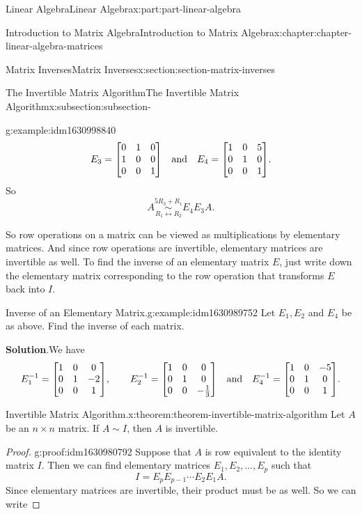 \documentclass[twoside,10pt,]{book}
\newcommand{\blocktitlefont}{\relax}
\numberwithin{equation}{part}
\newcommand{\rowop}[2][]{\overset{#2}{\underset{#1}{\sim}}}
\begin{document}
\begin{partptx}{Linear Algebra}{}{Linear Algebra}{}{}{x:part:part-linear-algebra}
\begin{chapterptx}{Introduction to Matrix Algebra}{}{Introduction to Matrix Algebra}{}{}{x:chapter:chapter-linear-algebra-matrices}
\begin{sectionptx}{Matrix Inverses}{}{Matrix Inverses}{}{}{x:section:section-matrix-inverses}
\begin{subsectionptx}{The Invertible Matrix Algorithm}{}{The Invertible Matrix Algorithm}{}{}{x:subsection:subsection-}
\begin{example}{}{g:example:idm1630998840}
\begin{equation*}
E_{3} = \mqty[0 & 1 & 0 \\ 1 & 0 & 0 \\ 0 & 0 & 1]\qq{and} E_{4} = \mqty[1 & 0 & 5 \\ 0 & 1 & 0 \\ 0 & 0 & 1].
\end{equation*}
So%
\begin{equation*}
A\rowop[R_{1}\leftrightarrow R_{2}]{5R_{3}+R_{1}} E_{4}E_{3}A.
\end{equation*}
%
\end{example}
So row operations on a matrix can be viewed as multiplications by elementary matrices. And since row operations are invertible, elementary matrices are invertible as well. To find the inverse of an elementary matrix \(E\), just write down the elementary matrix corresponding to the row operation that transforms \(E\) back into \(I\).%
\begin{example}{Inverse of an Elementary Matrix.}{g:example:idm1630989752}%
Let \(E_{1},E_{2}\) and \(E_{4}\) be as above. Find the inverse of each matrix.%
\par\smallskip%
\noindent\textbf{\blocktitlefont Solution}.\hypertarget{g:solution:idm1630987832}{}\quad{}We have%
\begin{equation*}
E_{1}^{-1} = \mqty[1 & 0 & 0 \\ 0 & 1 & -2 \\ 0 & 0 & 1],\qq{}E_{2}^{-1} = \mqty[1 & 0 & 0 \\ 0 & 1 & 0 \\ 0 & 0 & -\frac{1}{3}]\qq{and}E_{4}^{-1} = \mqty[1 & 0 & -5 \\ 0 & 1 & 0 \\ 0 & 0 & 1].
\end{equation*}
%
\end{example}
\begin{theorem}{Invertible Matrix Algorithm.}{}{x:theorem:theorem-invertible-matrix-algorithm}%
%
Let \(A\) be an \(n\times n\) matrix. If \(A\sim I\), then \(A\) is invertible.%
\end{theorem}
\begin{proof}{}{g:proof:idm1630980792}
Suppose that \(A\) is row equivalent to the identity matrix \(I\). Then we can find elementary matrices \(E_{1},E_{2},\ldots,E_{p}\) such that%
\begin{equation*}
I = E_{p}E_{p-1}\cdots E_{2}E_{1}A.
\end{equation*}
Since elementary matrices are invertible, their product must be as well. So we can write%

\end{proof}
\end{subsectionptx}
\end{sectionptx}
\end{chapterptx}
\end{partptx}
\end{document}
